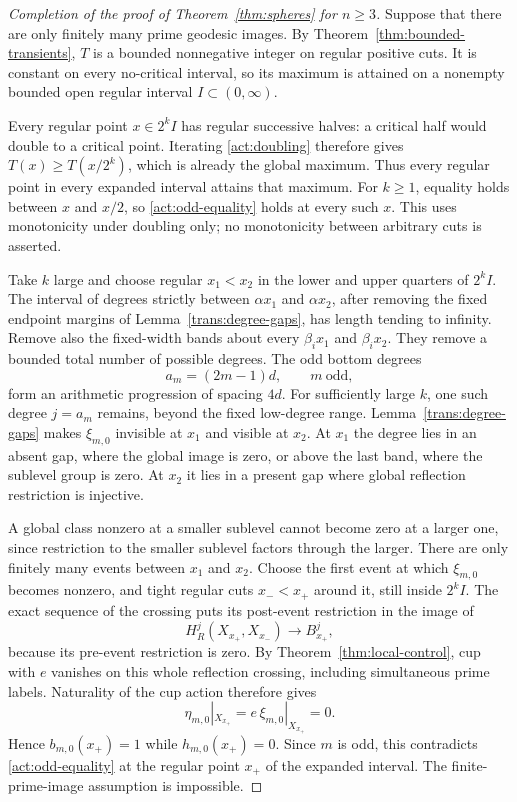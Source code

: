 \begin{proof}[Completion of the proof of Theorem~\ref{thm:spheres} for $n\ge3$]
Suppose that there are only finitely many prime geodesic images.
By Theorem~\ref{thm:bounded-transients}, $T$ is a bounded nonnegative
integer on regular positive cuts. It is constant on every no-critical
interval, so its maximum is attained on a nonempty bounded open regular
interval $I\subset(0,\infty)$.

Every regular point $x\in2^kI$ has regular successive halves: a critical
half would double to a critical point. Iterating \eqref{act:doubling}
therefore gives $T(x)\ge T(x/2^k)$, which is already the global maximum.
Thus every regular point in every expanded interval attains that maximum.
For $k\ge1$, equality holds between $x$ and $x/2$, so
\eqref{act:odd-equality} holds at every such $x$. This uses monotonicity
under doubling only; no monotonicity between arbitrary cuts is asserted.

Take $k$ large and choose regular $x_1<x_2$ in the lower and upper
quarters of $2^kI$. The interval of degrees strictly between
$\alpha x_1$ and $\alpha x_2$, after removing the fixed endpoint margins
of Lemma~\ref{trans:degree-gaps}, has length tending to infinity.
Remove also the fixed-width bands about every $\beta_i x_1$ and
$\beta_i x_2$. They remove a bounded total number of possible degrees.
The odd bottom degrees
\[
 a_m=(2m-1)d,\qquad m\ \text{odd},
\]
form an arithmetic progression of spacing $4d$. For sufficiently large
$k$, one such degree $j=a_m$ remains, beyond the fixed low-degree range.
Lemma~\ref{trans:degree-gaps} makes $\xi_{m,0}$ invisible at $x_1$
and visible at $x_2$. At $x_1$ the degree lies in an absent gap, where
the global image is zero, or above the last band, where the sublevel
group is zero. At $x_2$ it lies in a present gap where global reflection
restriction is injective.

A global class nonzero at a smaller sublevel cannot become zero at a
larger one, since restriction to the smaller sublevel factors through
the larger. There are only finitely many events between $x_1$ and $x_2$.
Choose the first event at which $\xi_{m,0}$ becomes nonzero, and tight
regular cuts $x_-<x_+$ around it, still inside $2^kI$. The exact sequence
of the crossing puts its post-event restriction in the image of
\[
 H_R^j(X_{x_+},X_{x_-})\longrightarrow B_{x_+}^j,
\]
because its pre-event restriction is zero. By
Theorem~\ref{thm:local-control}, cup with $e$ vanishes on this whole
reflection crossing, including simultaneous prime labels. Naturality
of the cup action therefore gives
\[
 \eta_{m,0}|_{X_{x_+}}=e\,\xi_{m,0}|_{X_{x_+}}=0.
\]
Hence $b_{m,0}(x_+)=1$ while $h_{m,0}(x_+)=0$. Since $m$ is odd,
this contradicts \eqref{act:odd-equality} at the regular point $x_+$
of the expanded interval. The finite-prime-image assumption is impossible.
\end{proof}
